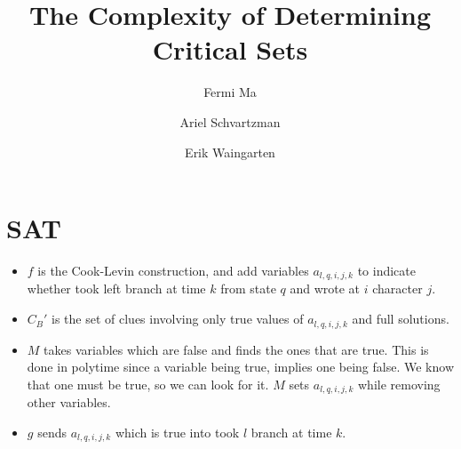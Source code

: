 \documentclass[runningheads,a4paper]{llncs}
\begin{document}
\mainmatter  %

\title{The Complexity of Determining Critical Sets}


%
%
\author{Fermi Ma \and Ariel Schvartzman \and Erik Waingarten}
%


%
%

\maketitle

\section{SAT}
\begin{itemize}
\item $f$ is the Cook-Levin construction, and add variables $a_{l, q, i, j, k}$ to indicate whether took left branch at time $k$ from state $q$ and wrote at $i$ character $j$. 
\item $C_B'$ is the set of clues involving only true values of $a_{l,q,i,j,k}$ and full solutions.
\item $M$ takes variables which are false and finds the ones that are true. This is done in polytime since a variable being true, implies one being false. We know that one must be true, so we can look for it. $M$ sets $a_{l,q,i,j,k}$ while removing other variables.
\item $g$ sends $a_{l,q,i,j,k}$ which is true into took $l$ branch at time $k$.
\end{itemize}
\end{document}
